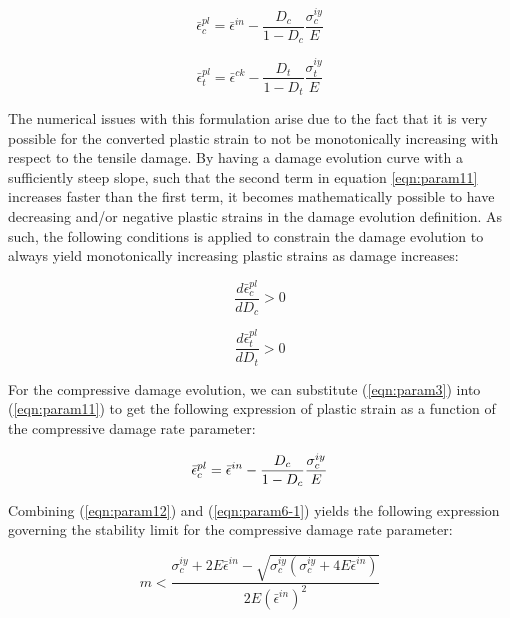 \begin{equation}
\label{eqn:param11}
\bar{\epsilon}_{c}^{pl}=\bar{\epsilon}^{in}-\frac{D_{c}}{1-D_{c}}\frac{\sigma_{c}^{iy}}{E}
\end{equation}

\begin{equation}
\label{eqn:param11-1}
\bar{\epsilon}_{t}^{pl}=\bar{\epsilon}^{ck}-\frac{D_{t}}{1-D_{t}}\frac{\sigma_{t}^{iy}}{E}
\end{equation}

The numerical issues with this formulation arise due to the fact that it is very possible for the converted plastic strain to not be monotonically increasing with respect to the tensile damage. By having a damage evolution curve with a sufficiently steep slope, such that the second term in equation \ref{eqn:param11} increases faster than the first term, it becomes mathematically possible to have decreasing and/or negative plastic strains in the damage evolution definition. As such, the following conditions is applied to constrain the damage evolution to always yield monotonically increasing plastic strains as damage increases:

\begin{equation}
\label{eqn:param6-1}
\frac{d\bar{\epsilon}_{c}^{pl}}{dD_{c}}>0
\end{equation}

\begin{equation}
\label{eqn:param6-2}
\frac{d\bar{\epsilon}_{t}^{pl}}{dD_{t}}>0
\end{equation}

For the compressive damage evolution, we can substitute (\ref{eqn:param3}) into (\ref{eqn:param11}) to get the following expression of plastic strain as a function of the compressive damage rate parameter:

\begin{equation}
\bar{\epsilon}_{c}^{pl}=\bar{\epsilon}^{in}-\frac{D_{c}}{1-D_{c}}\frac{\sigma_{c}^{iy}}{E}\\
\label{eqn:param12}
\end{equation}

Combining (\ref{eqn:param12}) and (\ref{eqn:param6-1}) yields the following expression governing the stability limit for the compressive damage rate parameter:

\begin{equation}
m<\frac{\sigma_{c}^{iy}+2E\bar{\epsilon}^{in}-\sqrt{\sigma_{c}^{iy}\left(\sigma_{c}^{iy}+4E\bar{\epsilon}^{in}\right)}}{2E\left(\bar{\epsilon}^{in}\right)^{2}}\label{eqn:param13}
\end{equation}

